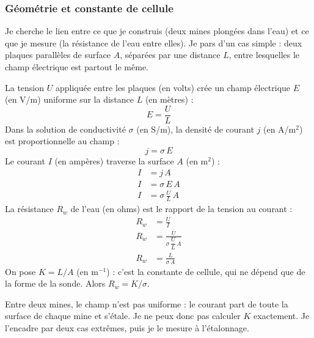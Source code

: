 \subsubsection*{Géométrie et constante de cellule}

Je cherche le lien entre ce que je construis (deux mines plongées dans l'eau) et ce que je mesure (la résistance de l'eau entre elles). Je pars d'un cas simple : deux plaques parallèles de surface $A$, séparées par une distance $L$, entre lesquelles le champ électrique est partout le même.

\begin{demonstration}
La tension $U$ appliquée entre les plaques (en volts) crée un champ électrique $E$ (en V/m) uniforme sur la distance $L$ (en mètres) :
\[
E = \frac{U}{L}
\]
Dans la solution de conductivité $\sigma$ (en S/m), la densité de courant $j$ (en A/m$^2$) est proportionnelle au champ :
\[
j = \sigma\,E
\]
Le courant $I$ (en ampères) traverse la surface $A$ (en m$^2$) :
\begin{align*}
I &= j\,A\\
I &= \sigma\,E\,A\\
I &= \sigma\,\frac{U}{L}\,A
\end{align*}
La résistance $R_w$ de l'eau (en ohms) est le rapport de la tension au courant :
\begin{align*}
R_w &= \frac{U}{I}\\
R_w &= \frac{U}{\sigma\,\dfrac{U}{L}\,A}\\
R_w &= \frac{L}{\sigma\,A}
\end{align*}
On pose $K = L/A$ (en m$^{-1}$) : c'est la constante de cellule, qui ne dépend que de la forme de la sonde. Alors $R_w = K/\sigma$.
\end{demonstration}

Entre deux mines, le champ n'est pas uniforme : le courant part de toute la surface de chaque mine et s'étale. Je ne peux donc pas calculer $K$ exactement. Je l'encadre par deux cas extrêmes, puis je le mesure à l'étalonnage.

